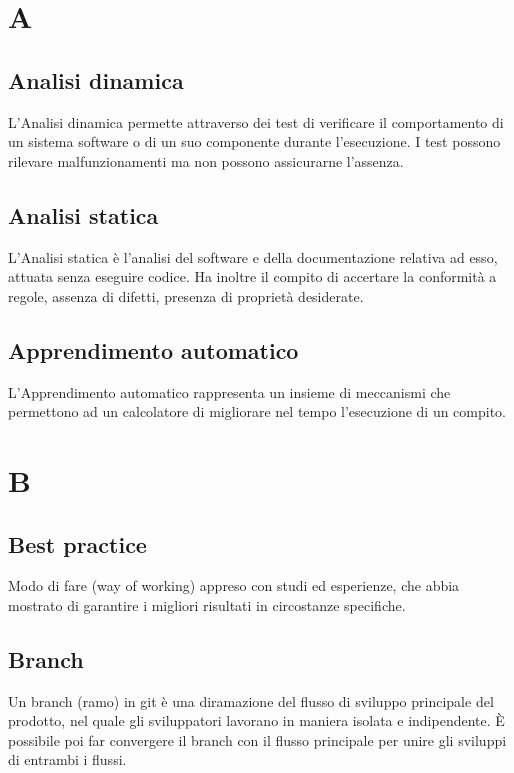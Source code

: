 {\begin{tabularx}{\textwidth}{ c | c | c | c | X }
	\end{tabularx}
	\newpage
	\setcounter{secnumdepth}{0}
	
	
	\printindex
	\newpage
	
	\section{A}
	\subsection{Analisi dinamica} 
	L'Analisi dinamica permette attraverso dei test di verificare il comportamento di un sistema software o di un suo componente durante l'esecuzione. I test possono rilevare malfunzionamenti ma non possono assicurarne l'assenza.
	
	\subsection{Analisi statica}
	L'Analisi statica è l'analisi del software e della documentazione relativa ad esso, attuata senza eseguire codice. Ha inoltre il compito di accertare la conformità a regole, assenza di difetti, presenza di proprietà desiderate.
	
	\subsection{Apprendimento automatico}
	L'Apprendimento automatico rappresenta un insieme di meccanismi che permettono ad un calcolatore di migliorare nel tempo l'esecuzione di un compito. 
	
	\section{B}
	\subsection{Best practice} 
	Modo di fare (way of working) appreso con studi ed esperienze, che abbia mostrato di garantire i migliori risultati in circostanze specifiche.
	
	\subsection{Branch} 
	Un branch (ramo) in git è una diramazione del flusso di sviluppo principale del prodotto, nel quale gli sviluppatori lavorano in maniera isolata e indipendente. \`E possibile poi far convergere il branch con il flusso principale per unire gli sviluppi di entrambi i flussi.
	
}
